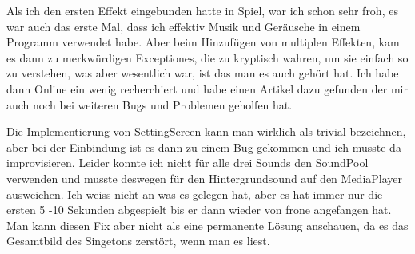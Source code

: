 Als ich den ersten Effekt eingebunden hatte in Spiel, war ich schon sehr froh, es war
auch das erste Mal, dass ich effektiv Musik und Geräusche in einem Programm verwendet
habe. Aber beim Hinzufügen von multiplen Effekten, kam es dann zu merkwürdigen Exceptiones,
die zu kryptisch wahren, um sie einfach so zu verstehen, was aber wesentlich war, ist das man
es auch gehört hat. Ich habe dann Online ein wenig recherchiert und habe einen Artikel dazu
gefunden der mir auch noch bei weiteren Bugs und Problemen geholfen hat.

Die Implementierung von SettingScreen kann man wirklich als trivial bezeichnen, aber bei der Einbindung
ist es dann zu einem Bug gekommen und ich musste da improvisieren. Leider konnte ich nicht für
alle drei Sounds den SoundPool verwenden und musste deswegen für den Hintergrundsound auf
den MediaPlayer ausweichen. Ich weiss nicht an was es gelegen hat, aber es hat immer nur die ersten
5 -10 Sekunden abgespielt bis er dann wieder von frone angefangen hat. Man kann diesen Fix aber nicht
als eine permanente Lösung anschauen, da es das Gesamtbild des Singetons zerstört, wenn man es liest.


